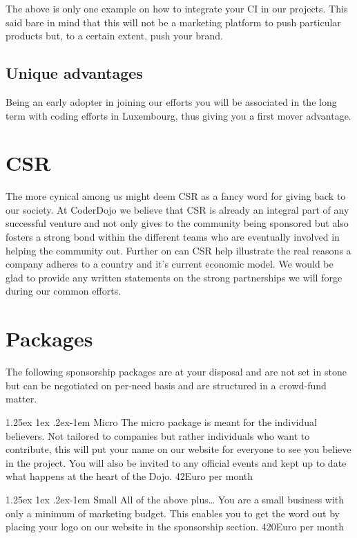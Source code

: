 \documentclass{proposal}
\makeatletter
\renewcommand{\paragraph}{
  \@startsection{paragraph}{4}
    {\z@}{1.25ex \@plus 1ex \@minus .2ex}{-1em}
      {\normalfont\normalsize\bfseries}
      }
\makeatother
\begin{document}
The above is only one example on how to integrate your CI in our projects. This said bare in mind that this will not be a marketing platform to push particular products but, to a certain extent, push your brand.

\subsection*{Unique advantages}
Being an early adopter in joining our efforts you will be associated in the long term with coding efforts in Luxembourg, thus giving you a first mover advantage.

\section*{CSR}
The more cynical among us might deem CSR as a fancy word for giving back to our society. At CoderDojo we believe that CSR is already an integral part of any successful venture and not only gives to the community being sponsored but also fosters a strong bond within the different teams who are eventually involved in helping the community out.
Further on can CSR help illustrate the real reasons a company adheres to a country and it's current economic model. We would be glad to provide any written statements on the strong partnerships we will forge during our common efforts.

\newpage


\section*{Packages}

The following sponsorship packages are at your disposal and are not set in stone but can be negotiated on per-need basis and are structured in a crowd-fund matter.

\paragraph{Micro}
The micro package is meant for the individual believers. Not tailored to companies but rather individuals who want to contribute, this will put your name on our website for everyone to see you believe in the project. You will also be invited to any official events and kept up to date what happens at the heart of the Dojo.
42Euro per month

\paragraph{Small}
All of the above plus\ldots
You are a small business with only a minimum of marketing budget. This enables you to get the word out by placing your logo on our website in the sponsorship section.
420Euro per month
\end{document}
